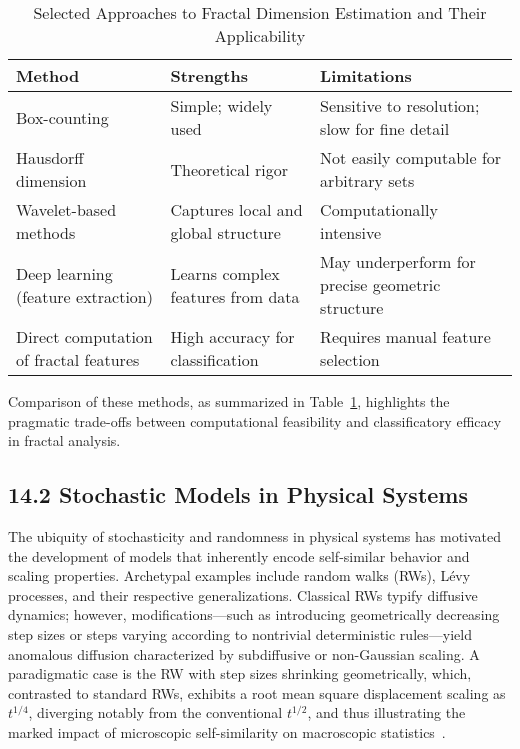 \documentclass[11pt]{article}
\begin{document}
\begin{table}[ht]
\centering
\caption{Selected Approaches to Fractal Dimension Estimation and Their Applicability}
\label{tab:fractal_methods}
\begin{tabular}{|l|l|l|}
\hline
\textbf{Method}                 & \textbf{Strengths}                          & \textbf{Limitations}                    \\ \hline
Box-counting                    & Simple; widely used                         & Sensitive to resolution; slow for fine detail \\ \hline
Hausdorff dimension             & Theoretical rigor                           & Not easily computable for arbitrary sets      \\ \hline
Wavelet-based methods           & Captures local and global structure         & Computationally intensive                      \\ \hline
Deep learning (feature extraction) & Learns complex features from data         & May underperform for precise geometric structure \\ \hline
Direct computation of fractal features & High accuracy for classification     & Requires manual feature selection                \\ \hline
\end{tabular}
\end{table}

Comparison of these methods, as summarized in Table~\ref{tab:fractal_methods}, highlights the pragmatic trade-offs between computational feasibility and classificatory efficacy in fractal analysis.

\subsection{14.2 Stochastic Models in Physical Systems}

The ubiquity of stochasticity and randomness in physical systems has motivated the development of models that inherently encode self-similar behavior and scaling properties. Archetypal examples include random walks (RWs), Lévy processes, and their respective generalizations. Classical RWs typify diffusive dynamics; however, modifications—such as introducing geometrically decreasing step sizes or steps varying according to nontrivial deterministic rules—yield anomalous diffusion characterized by subdiffusive or non-Gaussian scaling. A paradigmatic case is the RW with step sizes shrinking geometrically, which, contrasted to standard RWs, exhibits a root mean square displacement scaling as $t^{1/4}$, diverging notably from the conventional $t^{1/2}$, and thus illustrating the marked impact of microscopic self-similarity on macroscopic statistics~\cite{ref57}.
\end{document}
